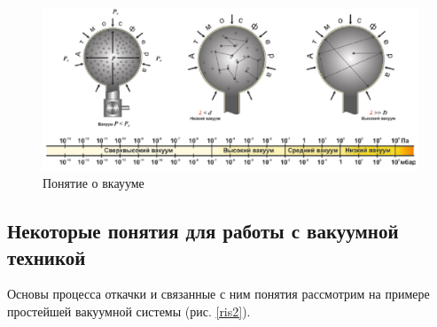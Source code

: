 \documentclass[a4paper, 12pt]{article}
\begin{document}
\begin{figure}[h!]
	\includegraphics[width = \textwidth]{1.png}
\caption{Понятие о вкаууме}
\label{ris1}
\end{figure}

\subsection{Некоторые понятия для работы с вакуумной техникой}

Основы процесса откачки и связанные с ним понятия рассмотрим на примере простейшей вакуумной системы (рис. \ref{ris2}).
\end{document}
